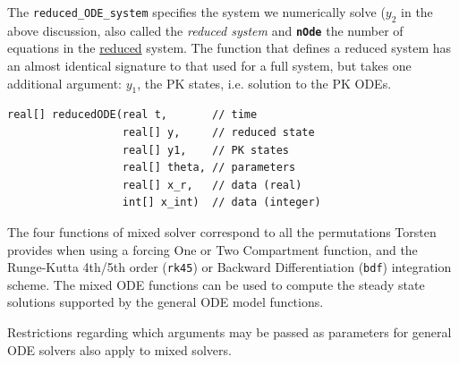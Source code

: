 \documentclass[11pt, reqno, oneside]{amsbook}
\numberwithin{equation}{chapter}
\numberwithin{figure}{chapter}
\numberwithin{table}{chapter}
\theoremstyle{remark}
\begin{document}
The \texttt{reduced\_ODE\_system} specifies the system we
numerically solve (\(y_2\) in the above discussion, also called the
\emph{reduced system} and {\small \color{MRGGreen} \texttt{\textbf{nOde}}} the number of equations in
the \underline{reduced} system. The function that defines a reduced
system has an almost identical signature to that used for a full
system, but takes one additional argument: \(y_1\), the PK states,
i.e. solution to the PK ODEs.
\begin{verbatim}
real[] reducedODE(real t,       // time
                  real[] y,     // reduced state
                  real[] y1,    // PK states
                  real[] theta, // parameters
                  real[] x_r,   // data (real)
                  int[] x_int)  // data (integer)
\end{verbatim}

The four functions of mixed solver correspond to all the permutations Torsten
provides when using a forcing One or Two Compartment function, and the
Runge-Kutta 4th/5th order (\texttt{rk45}) or Backward Differentiation (\texttt{bdf})
integration scheme. The mixed ODE functions can be used to compute the
steady state solutions supported by the general ODE model functions.

Restrictions regarding which arguments may be passed as parameters for
general ODE solvers also apply to
mixed solvers.
\end{document}
